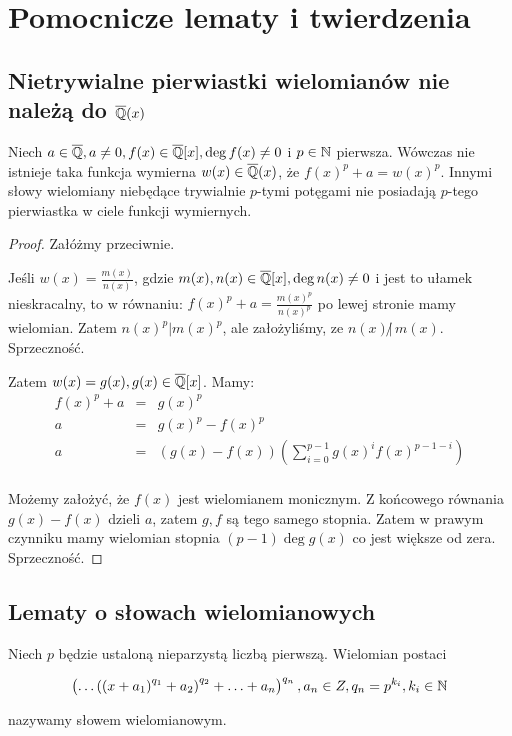\chapter{Pomocnicze lematy i twierdzenia}
\label{ch:auxiliary}
\section{Nietrywialne pierwiastki wielomianów nie należą do $\overline{\mathbb{Q}}(x)$}
\begin{lemma}
  Niech $a \in \overline{\mathbb{Q}}, a \neq 0, f(x) \in \overline{\mathbb{Q}}[x], \deg f(x)
  \neq 0$ i $p \in \mathbb{N}$ pierwsza.  Wówczas nie istnieje taka funkcja wymierna
  $w(x) \in \overline{\mathbb{Q}}(x)$, że $f(x)^{p} + a = w(x)^p$. Innymi słowy
  wielomiany niebędące trywialnie $p$-tymi potęgami nie posiadają $p$-tego
  pierwiastka w ciele funkcji wymiernych.
  \label{lem:nontrivial_roots}
\end{lemma}

\begin{proof}
Załóżmy przeciwnie.

Jeśli $w(x) = \frac{m(x)}{n(x)}$, gdzie $m(x), n(x) \in \overline{\mathbb{Q}}[x], \deg
n(x) \neq 0$ i jest to ułamek nieskracalny, to w równaniu: $f(x)^{p} + a =
\frac{m(x)^p}{n(x)^p}$ po lewej stronie mamy wielomian. Zatem $n(x)^p | m(x)^p$,
ale założyliśmy, ze $n(x) \! \! \not| \, m(x)$. Sprzeczność.

Zatem $w(x) = g(x), g(x) \in \overline{\mathbb{Q}}[x]$. Mamy:
\begin{eqnarray*}
  f(x)^p + a &=& g(x)^p \\
  a &=& g(x)^p - f(x)^p\\
  a &=& \left(g(x) - f(x)\right)\left(\sum_{i=0}^{p-1}g(x)^if(x)^{p-1 -
  i}\right)\\
\end{eqnarray*}

Możemy założyć, że $f(x)$ jest wielomianem monicznym. Z końcowego równania $g(x)
- f(x)$ dzieli $a$, zatem $g, f$ są tego samego stopnia. Zatem w prawym
czynniku mamy wielomian stopnia $(p-1)\deg g(x)$ co jest większe od zera.
Sprzeczność.
\end{proof}

\section{Lematy o słowach wielomianowych}
\begin{defin}
  Niech $p$ będzie ustaloną nieparzystą liczbą pierwszą. Wielomian postaci

  \begin{equation}
    \left( \ldots \left(\left(x + a_1\right)^{q_1} + a_2\right)^{q_2} +
      \ldots + a_n\right)^{q_n}, a_n \in Z, q_n = p^{k_i}, k_i \in \mathbb{N}
  \label{eq:polynomial_word_extended}
  \end{equation}

  nazywamy słowem wielomianowym.
\end{defin}

